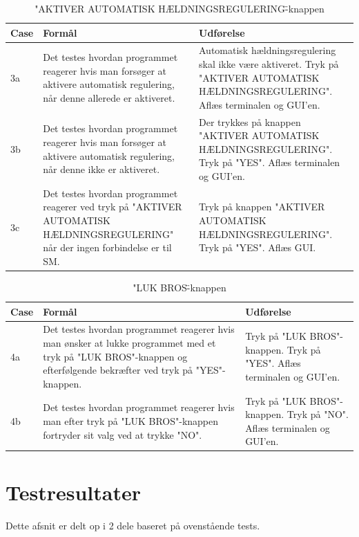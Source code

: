\begin{table}[H]
\caption{"AKTIVER AUTOMATISK HÆLDNINGSREGULERING\"-knappen}
\centering
\begin{tabular}{| p{1cm}  | p{4.5cm} | p{8cm} |}
\hline
Case &Formål &Udførelse\\\hline
3a &Det testes hvordan programmet reagerer hvis man forsøger at aktivere automatisk regulering, når denne allerede er aktiveret. &Automatisk hældningsregulering skal ikke være aktiveret. Tryk på "AKTIVER AUTOMATISK HÆLDNINGSREGULERING". Aflæs terminalen og GUI'en.\\\hline

3b &Det testes hvordan programmet reagerer hvis man forsøger at aktivere automatisk regulering, når denne ikke er aktiveret. &Der trykkes på knappen "AKTIVER AUTOMATISK HÆLDNINGSREGULERING". Tryk på "YES". Aflæs terminalen og GUI'en.\\\hline

3c &Det testes hvordan programmet reagerer ved tryk på "AKTIVER AUTOMATISK HÆLDNINGSREGULERING" når der ingen forbindelse er til SM.&Tryk på knappen "AKTIVER AUTOMATISK HÆLDNINGSREGULERING". Tryk på "YES". Aflæs GUI.\\\hline
\end{tabular}
\end{table}

\begin{table}[H]
\caption{"LUK BROS\"-knappen}
\centering
\begin{tabular}{| p{1cm}  | p{4.5cm} | p{8cm} |}
\hline
Case &Formål &Udførelse\\\hline
4a &Det testes hvordan programmet reagerer hvis man ønsker at lukke programmet med et tryk på "LUK BROS"-knappen og efterfølgende bekræfter ved tryk på "YES"-knappen.&Tryk på "LUK BROS"-knappen. Tryk på "YES". Aflæs terminalen og GUI'en.\\\hline

4b &Det testes hvordan programmet reagerer hvis man efter tryk på "LUK BROS"-knappen fortryder sit valg ved at trykke "NO".&Tryk på "LUK BROS"-knappen. Tryk på "NO". Aflæs terminalen og GUI'en.\\\hline
\end{tabular}
\end{table}
\section{Testresultater}
Dette afsnit er delt op i  2 dele baseret på ovenstående tests.\\
